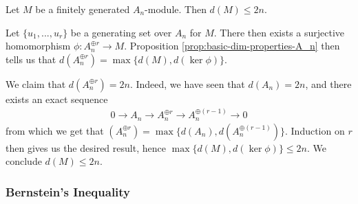 \begin{cor}\label{cor:dimension-upper-bound}
	Let $M$ be a finitely generated $A_n$-module. Then $d(M) \leq 2n$.
\end{cor}
\begin{prf}
	Let $\{u_1,...,u_r\}$ be a generating set over $A_n$ for $M$. There then exists a surjective homomorphism $\phi:A_n^{\oplus r} \to M$. Proposition \ref{prop:basic-dim-properties-A_n} then tells us that $d(A_n^{\oplus r}) = \max\{d(M), d(\ker \phi)\}$. 

	We claim that $d(A_n^{\oplus r}) = 2n$. Indeed, we have seen that $d(A_n) = 2n$, and there exists an exact sequence
	\begin{align*}
		0 \to A_n \to A_n^{\oplus r} \to A_n^{\oplus (r-1)} \to 0
	\end{align*}
	from which we get that $(A_n^{\oplus r}) = \max\{d(A_n),d(A_n^{\oplus (r-1)})\}$. Induction on $r$ then gives us the desired result, hence $\max\{d(M), d(\ker \phi)\} \leq 2n$. We conclude $d(M) \leq 2n$.
\end{prf}

\subsubsection{Bernstein's Inequality}

